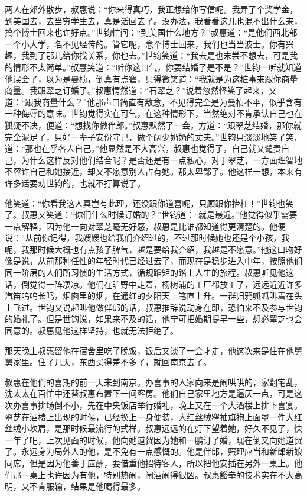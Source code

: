 \par 两人在郊外散步，叔惠说：“你来得真巧，我正想给你写信呢。我弄了个奖学金，到美国去，去当穷学生去，真是活回去了。没办法，我看看这儿也混不出什么来，搞个博士回来也许好点。”世钧忙问：“到美国什么地方？”叔惠道：“是他们西北部一个小大学，名不见经传的。管它呢，念个博士回来，我们也当当波士。你有兴趣，我到了那儿给你找关系，你也去。”世钧笑道：“我去是也未尝不想去，可是我的情形不太简单。”叔惠笑道：“听你这口气，你要结婚了是不是？”世钧一听就知道他误会了，以为是曼桢，倒真有点窘，只得微笑道：“我就是为这桩事来跟你商量商量。我跟翠芝订婚了。”叔惠愕然道：“石翠芝？”说着忽然怪笑了起来，又道：“跟我商量什么？”他那声口简直有敌意，不见得完全是为曼桢不平，似乎含有一种侮辱的意味。世钧觉得实在可气，在这种情形下，当然绝对不肯承认自己也在狐疑不决，便道：“想找你做伴郎。”叔惠默然了一会，方道：“跟翠芝结婚，那你就完全泥足了，只好一辈子安份守己，做个阔少奶奶的丈夫。”世钧只淡淡地笑了笑，道：“那也在乎各人自己。”他显然是不大高兴，叔惠也觉得了，自己就又谴责自己，为什么这样反对他们结合呢？是否还是有一点私心，对于翠芝，一方面理智地不容许自己和她接近，却又不愿意别人占有她。那太卑鄙了。他这样一想，本来有许多话要劝世钧的，也就不打算说了。
\par 他笑道：“你看我这人真岂有此理，还没跟你道喜呢，只顾跟你抬杠！”世钧也笑了。叔惠又笑道：“你们什么时候订婚的？”世钧道：“就是最近。”他觉得似乎需要一点解释，因为他一向对翠芝毫无好感，叔惠是比谁都知道得更清楚的。他便说：“从前你记得，我嫂嫂也给我们介绍过的，不过那时候她也还是个小孩，我呢，我那时候大概也有点孩子脾气，越是要给我介绍，我越是不愿意。”他这口吻好像是说，从前那种任性的年轻时代已经过去了，而现在是稳步进入中年，按照他们同一阶层的人们所习惯的生活方式，循规蹈矩的踏上人生的旅程。叔惠听见他这话，倒觉得一阵凄凉。他们在旷野中走着，杨树浦的工厂都放工了，远远近近许多汽笛呜呜长鸣，烟囱里的烟，在通红的夕阳天上笔直上升。一群归鸦呱呱叫着在头上飞过。世钧又说起叫他做伴郎的话，叔惠推辞说动身在即，恐怕来不及参与世钧的婚礼了。但是世钧说，如果来不及的话，他宁可把婚期提早一些，想必翠芝也会同意的。叔惠见他这样坚持，也就无法拒绝了。
\par 那天晚上叔惠留他在宿舍里吃了晚饭，饭后又谈了一会才走，他这次来是住在他舅舅家里。住了几天，东西买得差不多了，就回南京去了。
\par 叔惠在他们的喜期的前一天来到南京。办喜事的人家向来是闹哄哄的，家翻宅乱，沈太太在百忙中还替叔惠布置下一间客房。他们自己家里地方是逼仄一点，可是这次办喜事排场倒不小，先在中央饭店举行婚礼，晚上又在一个大酒楼上排下喜宴。翠芝在酒楼上出现的时候，已经换上一身便装，大红丝绒窄袖旗袍上面罩一件大红丝绒小坎肩，是那时候最流行的式样。叔惠远远的在灯下望着她，好久不见了，快一年了吧，上次见面的时候，他向她道贺因为她和一鹏订了婚，现在倒又向她道贺了。永远身为局外人的他，是不免有一点感慨的。他是伴郎，照理应当和新郎新娘同席，但是因为他善于应酬，要借重他招待客人，所以把他安插在另外一桌上。他们那一桌上也许因为有他，特别热闹，闹酒闹得很凶。叔惠豁拳的技术实在不大高明，又不肯服输，结果是他喝得最多。
